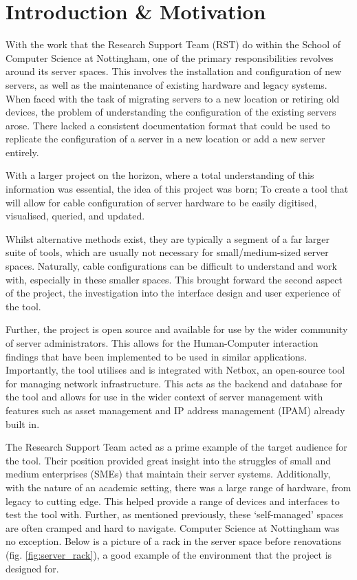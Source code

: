 \documentclass [11pt,a4paper]{article}
\begin{document}
\section{Introduction \& Motivation}
\label{sec:introduction}
With the work that the Research Support Team (RST) do within the School of Computer Science at Nottingham, one of the primary responsibilities revolves around its server spaces. This involves the installation and configuration of new servers, as well as the maintenance of existing hardware and legacy systems. When faced with the task of migrating servers to a new location or retiring old devices, the problem of understanding the configuration of the existing servers arose. There lacked a consistent documentation format that could be used to replicate the configuration of a server in a new location or add a new server entirely.

With a larger project on the horizon, where a total understanding of this information was essential, the idea of this project was born; To create a tool that will allow for cable configuration of server hardware to be easily digitised, visualised, queried, and updated.

Whilst alternative methods exist, they are typically a segment of a far larger suite of tools, which are usually not necessary for small/medium-sized server spaces. Naturally, cable configurations can be difficult to understand and work with, especially in these smaller spaces. This brought forward the second aspect of the project, the investigation into the interface design and user experience of the tool.

Further, the project is open source and available for use by the wider community of server administrators. This allows for the Human-Computer interaction findings that have been implemented to be used in similar applications. Importantly, the tool utilises and is integrated with Netbox\cite{Netbox}, an open-source tool for managing network infrastructure. This acts as the backend and database for the tool and allows for use in the wider context of server management with features such as asset management and IP address management (IPAM) already built in.

The Research Support Team acted as a prime example of the target audience for the tool. Their position provided great insight into the struggles of small and medium enterprises (SMEs) that maintain their server systems. Additionally, with the nature of an academic setting, there was a large range of hardware, from legacy to cutting edge. This helped provide a range of devices and interfaces to test the tool with. Further, as mentioned previously, these `self-managed' spaces are often cramped and hard to navigate. Computer Science at Nottingham was no exception. Below is a picture of a rack in the server space before renovations (fig. \ref{fig:server_rack}), a good example of the environment that the project is designed for.
\end{document}
